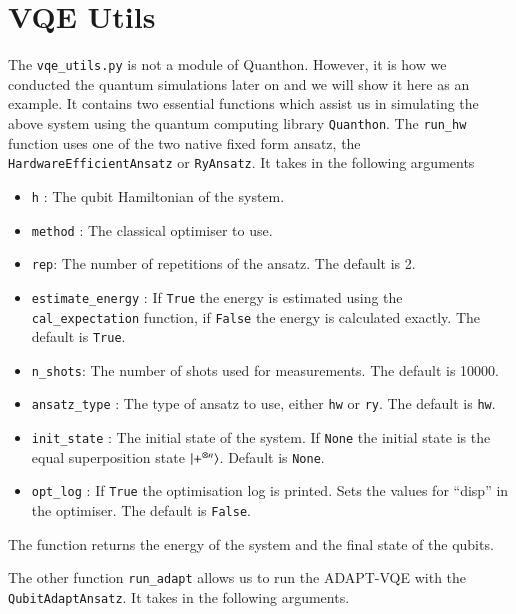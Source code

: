 \section{VQE Utils}
The \texttt{vqe\_utils.py} is not a module of Quanthon. However, it is how we conducted the quantum simulations later on and we will show it here as an example. It contains two essential functions which assist us in simulating the above system using the quantum computing library \texttt{Quanthon}. The \texttt{run\_hw} function uses one of the two native fixed form ansatz, the \texttt{HardwareEfficientAnsatz} or \texttt{RyAnsatz}. It takes in the following arguments
\begin{itemize}
    \item \texttt{h} : The qubit Hamiltonian of the system.
    \item \texttt{method} : The classical optimiser to use.
    \item \texttt{rep}: The number of repetitions of the ansatz. The default is 2.
    \item \texttt{estimate\_energy} : If \texttt{True} the energy is estimated using the \texttt{cal\_expectation} function, if \texttt{False} the energy is calculated exactly. The default is \texttt{True}.
    \item \texttt{n\_shots}: The number of shots used for measurements. The default is 10000.
    \item \texttt{ansatz\_type} : The type of ansatz to use, either \texttt{hw} or \texttt{ry}. The default is \texttt{hw}.
    \item \texttt{init\_state} : The initial state of the system. If \texttt{None} the initial state is the equal superposition state $ \ket{+^{\otimes n}} $. Default is \texttt{None}.
    \item \texttt{opt\_log} : If \texttt{True} the optimisation log is printed. Sets the values for ``disp'' in the optimiser. The default is \texttt{False}.
\end{itemize}
The function returns the energy of the system and the final state of the qubits.

The other function \texttt{run\_adapt} allows us to run the ADAPT-VQE with the \texttt{QubitAdaptAnsatz}. It takes in the following arguments.

